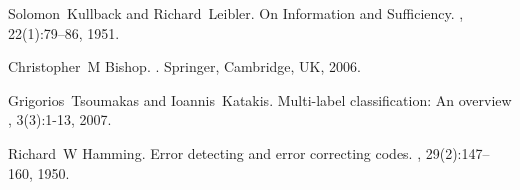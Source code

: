 \documentclass[13pt,journal,compsoc,onecolumn]{IEEEtran}
\begin{document}
\begin{thebibliography}{10}
Solomon~Kullback and Richard~Leibler.
\newblock On Information and Sufficiency.
, 22(1):79–86, 1951.

Christopher~M Bishop.
.
\newblock Springer, Cambridge, UK, 2006.

Grigorios~Tsoumakas and Ioannis~Katakis.
\newblock Multi-label classification: An overview
, 3(3):1-13, 2007.

Richard~W Hamming.
\newblock Error detecting and error correcting codes.
, 29(2):147–160, 1950.


\end{thebibliography}

% 









\end{document}
